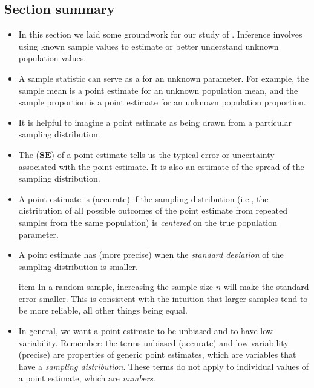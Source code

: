 \textA{\newpage}

\subsection*{Section summary}
\begin{itemize}
\item In this section we laid some groundwork for our study of .  Inference involves using known sample values to estimate or better understand unknown population values.

\item  A sample statistic can serve as a  for an unknown parameter.  For example, the sample mean is a point estimate for an unknown population mean, and the sample proportion is a point estimate for an unknown population proportion.

\item It is helpful to imagine a point estimate as being drawn from a particular sampling distribution.  

\item The  ($\textbf{SE}$) of a point estimate tells us the typical error or uncertainty associated with the point estimate.  It is also an estimate of the spread of the sampling distribution.  

\item A point estimate is  (accurate) if the sampling distribution (i.e., the distribution of all possible outcomes of the point estimate from repeated samples from the same population) is \textit{centered} on the true population parameter.  

\item A point estimate has  (more precise) when the \textit{standard deviation} of the sampling distribution is smaller. 

item In a random sample, increasing the sample size $n$ will make the standard error smaller.  This is consistent with the intuition that larger samples tend to be more reliable, all other things being equal.

\item In general, we want a point estimate to be unbiased and to have low variability.  Remember:  the terms unbiased (accurate) and low variability (precise) are properties of generic point estimates, which are variables that have a \emph{sampling distribution}.  These terms do not apply to individual values of a point estimate, which are \textit{numbers}.  

\end{itemize}


